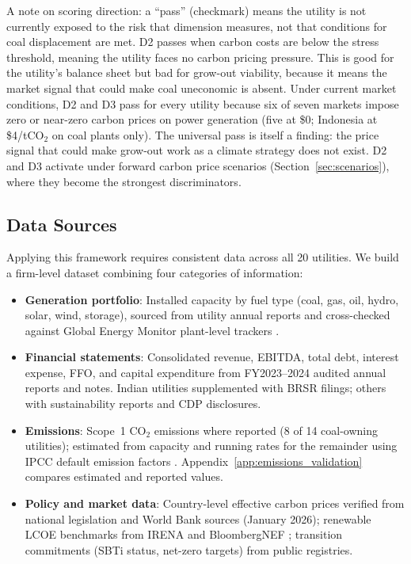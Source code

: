\documentclass[review,3p,authoryear]{elsarticle}
\begin{document}
A note on scoring direction: a ``pass'' (checkmark) means the utility is not currently exposed to the risk that dimension measures, not that conditions for coal displacement are met. D2 passes when carbon costs are below the stress threshold, meaning the utility faces no carbon pricing pressure. This is good for the utility's balance sheet but bad for grow-out viability, because it means the market signal that could make coal uneconomic is absent. Under current market conditions, D2 and D3 pass for every utility because six of seven markets impose zero or near-zero carbon prices on power generation (five at \$0; Indonesia at \$4/tCO$_2$ on coal plants only). The universal pass is itself a finding: the price signal that could make grow-out work as a climate strategy does not exist. D2 and D3 activate under forward carbon price scenarios (Section~\ref{sec:scenarios}), where they become the strongest discriminators.

\subsection{Data Sources}
\label{sec:data_sources}

Applying this framework requires consistent data across all 20 utilities. We build a firm-level dataset combining four categories of information:

\begin{itemize}
\item \textbf{Generation portfolio}: Installed capacity by fuel type (coal, gas, oil, hydro, solar, wind, storage), sourced from utility annual reports and cross-checked against Global Energy Monitor plant-level trackers \citep{GEM2026Coal,GEM2026Solar,GEM2026Wind}.
\item \textbf{Financial statements}: Consolidated revenue, EBITDA, total debt, interest expense, FFO, and capital expenditure from FY2023--2024 audited annual reports and notes. Indian utilities supplemented with BRSR filings; others with sustainability reports and CDP disclosures.
\item \textbf{Emissions}: Scope~1 CO$_2$ emissions where reported (8 of 14 coal-owning utilities); estimated from capacity and running rates for the remainder using IPCC default emission factors \citep{IPCC2006}. Appendix~\ref{app:emissions_validation} compares estimated and reported values.
\item \textbf{Policy and market data}: Country-level effective carbon prices verified from national legislation and World Bank sources (January 2026); renewable LCOE benchmarks from IRENA and BloombergNEF \citep{IRENA2024,BNEF2024}; transition commitments (SBTi status, net-zero targets) from public registries.
\end{itemize}
\end{document}

